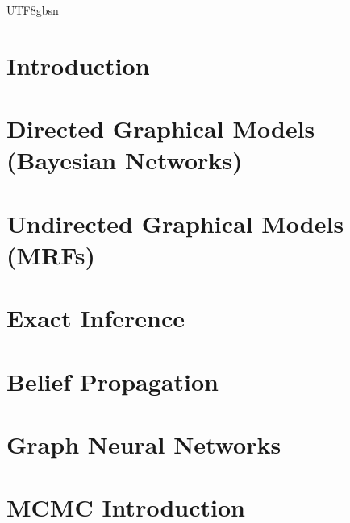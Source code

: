 \documentclass[11pt]{article}
\begin{document}
\begin{CJK}{UTF8}{gbsn}
\newpage

\section{Introduction}


\section{Directed Graphical Models (Bayesian Networks)}


\section{Undirected Graphical Models (MRFs)}


\section{Exact Inference}


\section{Belief Propagation}


\section{Graph Neural Networks}


\section{MCMC Introduction}


\end{CJK}
\end{document}
